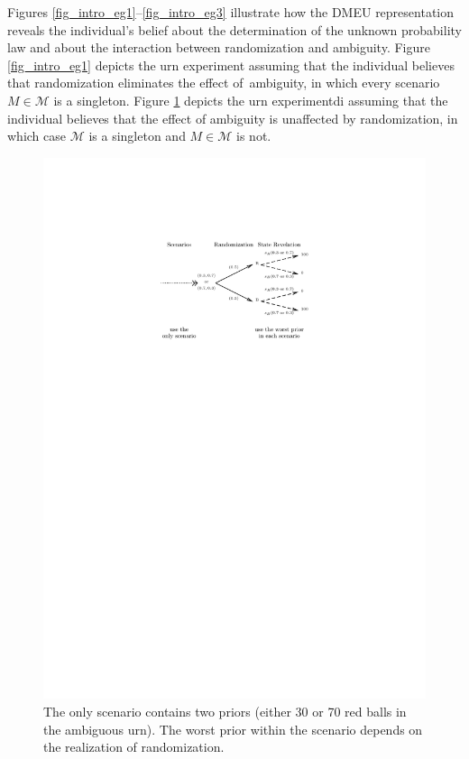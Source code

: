 \documentclass[12pt, notitlepage]{article}
\begin{document}
Figures \ref{fig_intro_eg1}--\ref{fig_intro_eg3} illustrate how the DMEU
representation reveals the individual's belief about the determination of
the unknown probability law and about the interaction between randomization
and ambiguity. Figure \ref{fig_intro_eg1} depicts the urn experiment assuming
that the individual believes that randomization eliminates the effect of\
ambiguity, in which every scenario $M\in \mathcal{M}$ is a singleton. Figure %
\ref{fig_intro_eg2} depicts the urn experimentdi assuming that the individual
believes that the effect of ambiguity is unaffected by randomization, in
which case $\mathcal{M}$ is a singleton and $M\in \mathcal{M}$ is not.

\begin{figure}[h!]
  \centering   
    \includegraphics{img/intro_eg2.pdf}
    \caption{The only
scenario contains two priors (either 30 or 70 red balls in the ambiguous
urn). The worst prior within the scenario depends on the realization of
randomization.}
\label{fig_intro_eg2}
\end{figure}
\end{document}
